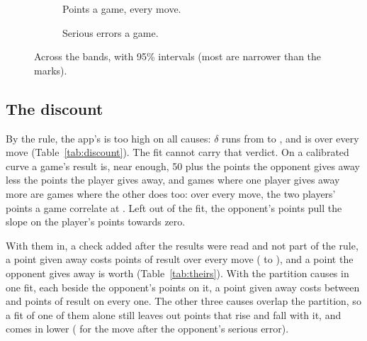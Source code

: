 \documentclass[11pt]{article}
\begin{document}
\begin{figure}[h]
\centering
\begin{subfigure}{0.49\textwidth}\centering\AllPlot\caption{Points a game, every move.}\end{subfigure}\hfill
\begin{subfigure}{0.49\textwidth}\centering\SeriousPlot\caption{Serious errors a game.}\end{subfigure}
\caption{Across the \Bands{} bands, with 95\% intervals (most are narrower than the marks).}
\label{fig:trend}
\end{figure}

\begin{table}[h]
\centering
\scriptsize\KindsTable
\caption{Error kinds by band: serious errors a game and the kinds the reader tags among them, with
95\% intervals.}
\label{tab:kinds}
\end{table}

\begin{table}[h]
\centering
\scriptsize\KindDiffTable
\caption{What each kind costs, his band against the band above (added after the results were read;
it tests nothing): points a game, the difference and its share of the difference on every move.
The four kinds below serious errors split them.}
\label{tab:kinddiff}
\end{table}

\begin{table}[h]
\centering
\scriptsize\TrendTable
\caption{Points a game on each cause, by band.}
\label{tab:trend}
\end{table}

\subsection{The discount}
\label{sec:discount}

By the rule, the app's \Discount{} is too high on all \Causes{} causes: $\delta$ runs from
\DiscountMin{} to \DiscountMax, and is \AllDiscount{} over every move (Table~\ref{tab:discount}).
The fit cannot carry that verdict. On a calibrated curve a game's result is, near enough, 50 plus
the points the opponent gives away less the points the player gives away, and games where one
player gives away more are games where the other does too: over every move, the two players' points
a game correlate at \CorrAll. Left out of the fit, the opponent's points pull the slope on the
player's points towards zero.

With them in, a check added after the results were read and not part of the rule, a point given
away costs \TheirsAll{} points of result over every move (\TheirsAllLo{} to \TheirsAllHi), and a
point the opponent gives away is worth \TheirsAllOpp{} (Table~\ref{tab:theirs}). With the
\PartitionCauses{} partition causes in one fit, each beside the opponent's points on it, a point
given away costs between \PartitionMin{} and \PartitionMax{} points of result on every one. The
other three causes overlap the partition, so a fit of one of them alone still leaves out points that
rise and fall with it, and comes in lower (\GiftTheirs{} for the move after the opponent's serious
error).
\end{document}
